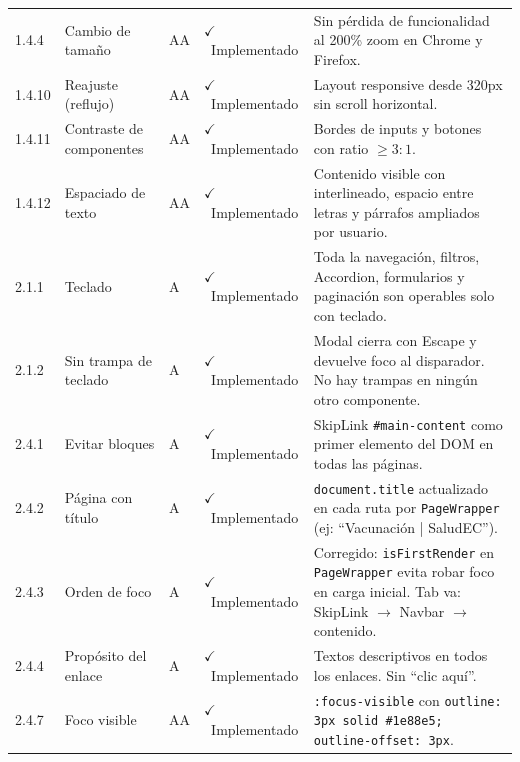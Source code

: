 \documentclass[12pt, a4paper]{article}
\newcommand{\cmark}{\textcolor{successgreen}{$\checkmark$}}
\begin{document}
\begin{longtable}{@{}>{\ttfamily\small}p{1.2cm} p{3.2cm} >{\centering\arraybackslash}p{0.9cm} >{\centering\arraybackslash\small}p{2.5cm} p{5.5cm}@{}}
1.4.4 & Cambio de tamaño & AA & \textcolor{successgreen}{\cmark~Implementado} & Sin pérdida de funcionalidad al 200\% zoom en Chrome y Firefox. \\

1.4.10 & Reajuste (reflujo) & AA & \textcolor{successgreen}{\cmark~Implementado} & Layout responsive desde 320px sin scroll horizontal. \\

1.4.11 & Contraste de componentes & AA & \textcolor{successgreen}{\cmark~Implementado} & Bordes de inputs y botones con ratio $\geq 3:1$. \\

1.4.12 & Espaciado de texto & AA & \textcolor{successgreen}{\cmark~Implementado} & Contenido visible con interlineado, espacio entre letras y párrafos ampliados por usuario. \\

2.1.1 & Teclado & A & \textcolor{successgreen}{\cmark~Implementado} & Toda la navegación, filtros, Accordion, formularios y paginación son operables solo con teclado. \\

2.1.2 & Sin trampa de teclado & A & \textcolor{successgreen}{\cmark~Implementado} & Modal cierra con Escape y devuelve foco al disparador. No hay trampas en ningún otro componente. \\

2.4.1 & Evitar bloques & A & \textcolor{successgreen}{\cmark~Implementado} & SkipLink \texttt{\#main-content} como primer elemento del DOM en todas las páginas. \\

2.4.2 & Página con título & A & \textcolor{successgreen}{\cmark~Implementado} & \texttt{document.title} actualizado en cada ruta por \texttt{PageWrapper} (ej: ``Vacunación | SaludEC''). \\

2.4.3 & Orden de foco & A & \textcolor{successgreen}{\cmark~Implementado} & Corregido: \texttt{isFirstRender} en \texttt{PageWrapper} evita robar foco en carga inicial. Tab va: SkipLink $\to$ Navbar $\to$ contenido. \\

2.4.4 & Propósito del enlace & A & \textcolor{successgreen}{\cmark~Implementado} & Textos descriptivos en todos los enlaces. Sin ``clic aquí''. \\

2.4.7 & Foco visible & AA & \textcolor{successgreen}{\cmark~Implementado} & \texttt{:focus-visible} con \texttt{outline: 3px solid \#1e88e5; outline-offset: 3px}. \\


\end{longtable}
\end{document}
